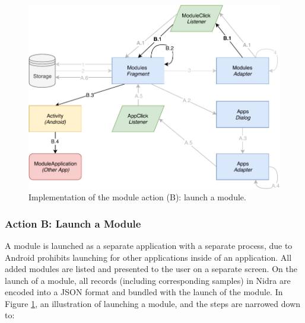 \begin{figure}[!h]
    \centering
    \includegraphics[scale=0.7]{images/Module_ImpB.pdf}
    \caption{Implementation of the module action (B): launch a module.}
    \label{fig:impl_modulesB}
\end{figure}

\subsubsection{Action B: Launch a Module}
A module is launched as a separate application with a separate process, due to Android prohibits launching for other applications inside of an application. All added modules are listed and presented to the user on a separate screen. On the launch of a module, all records (including corresponding samples) in Nidra are encoded into a JSON format and bundled with the launch of the module. In Figure \ref{fig:impl_modulesB}, an illustration of launching a module, and the steps are narrowed down to:

